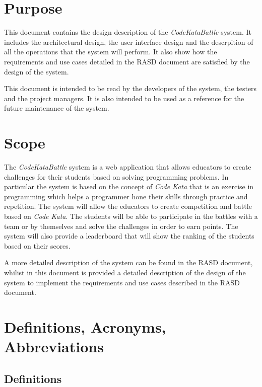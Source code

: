 \section{Purpose}
\label{s:Purpose}%

This document contains the design description of the \emph{CodeKataBattle} system. It includes the architectural design, the user interface design and the descrpition of all the operations that the system will perform. It also show how the requirements and use cases detailed in the RASD document are satisfied by the design of the system.

This document is intended to be read by the developers of the system, the testers and the project managers. It is also intended to be used as a reference for the future maintenance of the system.

\section{Scope}
\label{s:Scope}%

The \emph{CodeKataBattle} system is a web application that allows educators to create challenges for their students based on solving programming problems. In particular the system is based on the concept of \emph{Code Kata} that is an exercise in programming which helps a programmer hone their skills through practice and repetition. The system will allow the educators to create competition and battle based on \emph{Code Kata}. The students will be able to participate in the battles with a team or by themselves and solve the challenges in order to earn points. The system will also provide a leaderboard that will show the ranking of the students based on their scores.

A more detailed description of the system can be found in the RASD document, whilist in this document is provided a detailed description of the design of the system to implement the requirements and use cases described in the RASD document.

\newpage

\section{Definitions, Acronyms, Abbreviations}
\label{s:definitions-acronyms-abbreviations}%
\subsection{Definitions}
\label{ss:Definitions}

